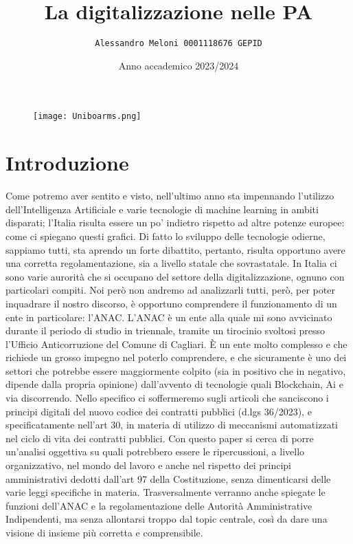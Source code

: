 \documentclass{article}
\title{\huge\textbf{La digitalizzazione nelle PA}}
\author{\texttt{Alessandro Meloni 0001118676 GEPID}}
\date{Anno accademico 2023/2024}
\begin{document}
\begin{figure}
    \centering
    \texttt{[image: Uniboarms.png]}
\end{figure}
\maketitle

\centering \tableofcontents

\newpage\centering
\section{Introduzione}
\begin{justify}
Come potremo aver sentito e visto, nell'ultimo anno sta impennando l'utilizzo dell'Intelligenza Artificiale e varie tecnologie di machine learning in ambiti disparati; l'Italia risulta essere un po' indietro rispetto ad altre potenze europee: come ci spiegano questi grafici.
Di fatto lo sviluppo delle tecnologie odierne, sappiamo tutti, sta aprendo un forte dibattito, pertanto, risulta opportuno avere una corretta regolamentazione, sia a livello statale che sovrastatale.
In Italia ci sono varie aurorità che si occupano del settore della digitalizzazione, ognuno con particolari compiti. Noi però non andremo ad analizzarli tutti, però, per poter inquadrare il nostro discorso, è opportuno comprendere il funzionamento di un ente in particolare: l'ANAC.
L'ANAC è un ente alla quale mi sono avvicinato durante il periodo di studio in triennale, tramite un tirocinio svoltosi presso l'Ufficio Anticorruzione del Comune di Cagliari. È un ente molto complesso e che richiede un grosso impegno nel poterlo comprendere, e che sicuramente è uno dei settori che potrebbe essere maggiormente colpito (sia in positivo che in negativo, dipende dalla propria opinione) dall'avvento di tecnologie quali Blockchain, Ai e via discorrendo. Nello specifico ci soffermeremo sugli articoli che sanciscono i principi digitali del nuovo codice dei contratti pubblici (d.lgs 36/2023), e specificatamente nell'art 30, in materia di utilizzo di meccanismi automatizzati nel ciclo di vita dei contratti pubblici. Con questo paper si cerca di porre un'analisi oggettiva su quali potrebbero essere le ripercussioni, a livello organizzativo, nel mondo del lavoro e anche nel rispetto dei principi amministrativi dedotti dall'art 97 della Costituzione, senza dimenticarsi delle varie leggi specifiche in materia.
Trasversalmente verranno anche spiegate le funzioni dell'ANAC e la regolamentazione delle Autorità Amministrative Indipendenti, ma senza allontarsi troppo dal topic centrale, così da dare una visione di insieme più corretta e comprensibile.
\end{justify}
\end{document}
